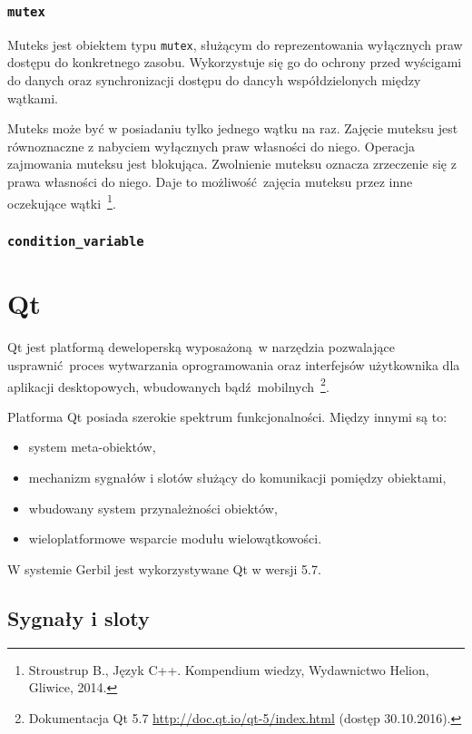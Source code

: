  \subsubsection{\lstinline$mutex$}
Muteks jest obiektem typu \lstinline$mutex$, służącym do reprezentowania wyłącznych praw dostępu do konkretnego zasobu. Wykorzystuje się go do ochrony przed wyścigami do danych oraz synchronizacji dostępu do dancyh współdzielonych między wątkami.

Muteks może być w posiadaniu tylko jednego wątku na raz. Zajęcie muteksu jest równoznaczne z nabyciem wyłącznych praw własności do niego. Operacja zajmowania muteksu jest blokująca. Zwolnienie muteksu oznacza zrzeczenie się z prawa własności do niego. Daje to możliwość zajęcia muteksu przez inne oczekujące wątki~\footnote{Stroustrup B., Język C++. Kompendium wiedzy, Wydawnictwo Helion, Gliwice, 2014.}.

\subsubsection{\lstinline$condition_variable$}

 \section{Qt}

Qt jest platformą deweloperską wyposażoną w narzędzia pozwalające usprawnić proces wytwarzania oprogramowania oraz interfejsów użytkownika dla aplikacji desktopowych, wbudowanych bądź mobilnych~\footnote{Dokumentacja Qt 5.7 \url{http://doc.qt.io/qt-5/index.html} (dostęp 30.10.2016).}.

Platforma Qt posiada szerokie spektrum funkcjonalności. Między innymi są to:
\begin{itemize}
	\item system meta-obiektów,
	\item mechanizm sygnałów i slotów służący do komunikacji pomiędzy obiektami,
	\item wbudowany system przynależności obiektów,
	\item wieloplatformowe wsparcie modułu wielowątkowości.
		
\end{itemize}

W systemie Gerbil jest wykorzystywane Qt w wersji 5.7.

  \subsection{Sygnały i sloty}

